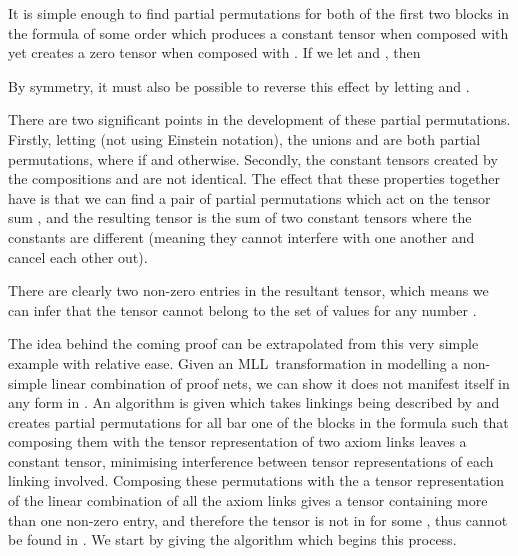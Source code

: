 \documentclass{LMCS}
\theoremstyle{plain}\newtheorem*{cLm}{Claim}
\newcommand{\mll}{MLL} \newcommand{\mall}{MALL}
\newcommand{\p}{} \newcommand{\N}{\mathbb{N}}
\begin{document}
  \p It is simple enough to find partial permutations for both of the first two blocks in the formula of some order which produces a constant tensor when composed with  yet creates a zero tensor when composed with . If we let  and , then
  

\noindent  By symmetry, it must also be possible to reverse this effect by letting  and .
  
  
  There are two significant points in the development of these partial permutations. Firstly, letting  (not using Einstein notation), the unions  and  are both partial permutations, where  if  and  otherwise. Secondly, the constant tensors created by the compositions  and  are not identical. The effect that these properties together have is that we can find a pair of partial permutations which act on the tensor sum , and the resulting tensor is the sum of two constant tensors where the constants are different (meaning they cannot interfere with one another and cancel each other out).
  
  There are clearly two non-zero entries in the resultant tensor, which means we can infer that the tensor  cannot belong to the set of values  for any number .
  
  \p The idea behind the coming proof can be extrapolated from this very simple example with relative ease. Given an \mll~transformation  in  modelling a non-simple linear combination of proof nets, we can show it does not manifest itself in any form in . An algorithm is given which takes linkings being described by  and creates partial permutations for all bar one of the blocks in the formula such that composing them with the tensor representation of two axiom links leaves a constant tensor, minimising interference between tensor representations of each linking involved. Composing these permutations with the a tensor representation of the linear combination of all the axiom links gives a tensor containing more than one non-zero entry, and therefore the tensor  is not in  for some , thus  cannot be found in . We start by giving the algorithm which begins this process.
  
\end{document}
